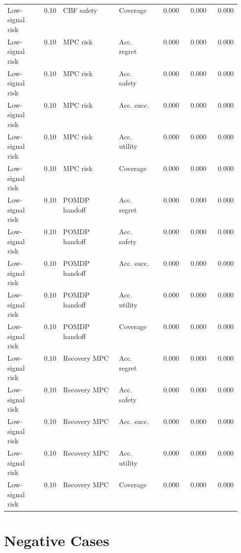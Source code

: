 \documentclass{article}
\begin{document}
\begin{center}
\begin{longtable}{p{0.14\linewidth}rp{0.24\linewidth}p{0.17\linewidth}rrr}
Low-signal risk & 0.10 & CBF safety & Coverage & 0.000 & 0.000 & 0.000\\
Low-signal risk & 0.10 & MPC risk & Acc. regret & 0.000 & 0.000 & 0.000\\
Low-signal risk & 0.10 & MPC risk & Acc. safety & 0.000 & 0.000 & 0.000\\
Low-signal risk & 0.10 & MPC risk & Acc. succ. & 0.000 & 0.000 & 0.000\\
Low-signal risk & 0.10 & MPC risk & Acc. utility & 0.000 & 0.000 & 0.000\\
Low-signal risk & 0.10 & MPC risk & Coverage & 0.000 & 0.000 & 0.000\\
Low-signal risk & 0.10 & POMDP handoff & Acc. regret & 0.000 & 0.000 & 0.000\\
Low-signal risk & 0.10 & POMDP handoff & Acc. safety & 0.000 & 0.000 & 0.000\\
Low-signal risk & 0.10 & POMDP handoff & Acc. succ. & 0.000 & 0.000 & 0.000\\
Low-signal risk & 0.10 & POMDP handoff & Acc. utility & 0.000 & 0.000 & 0.000\\
Low-signal risk & 0.10 & POMDP handoff & Coverage & 0.000 & 0.000 & 0.000\\
Low-signal risk & 0.10 & Recovery MPC & Acc. regret & 0.000 & 0.000 & 0.000\\
Low-signal risk & 0.10 & Recovery MPC & Acc. safety & 0.000 & 0.000 & 0.000\\
Low-signal risk & 0.10 & Recovery MPC & Acc. succ. & 0.000 & 0.000 & 0.000\\
Low-signal risk & 0.10 & Recovery MPC & Acc. utility & 0.000 & 0.000 & 0.000\\
Low-signal risk & 0.10 & Recovery MPC & Coverage & 0.000 & 0.000 & 0.000\\
\bottomrule
\end{longtable}
\normalsize
\end{center}

\section{Negative Cases}
\end{document}
